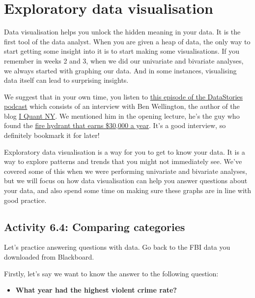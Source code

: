 \documentclass[
]{book}
\providecommand{\tightlist}{%
  \setlength{\itemsep}{0pt}\setlength{\parskip}{0pt}}
\begin{document}
\hypertarget{exploratory-data-visualisation}{%
\section{Exploratory data visualisation}\label{exploratory-data-visualisation}}

Data visualisation helps you unlock the hidden meaning in your data. It is the first tool of the data analyst. When you are given a heap of data, the only way to start getting some insight into it is to start making some visualisations. If you remember in weeks 2 and 3, when we did our univariate and bivariate analyses, we always started with graphing our data. And in some instances, visualising data itself can lead to surprising insights.

We suggest that in your own time, you listen to \href{http://datastori.es/66-iquantnyc/}{this episode of the DataStories podcast} which consists of an interview with Ben Wellington, the author of the blog \href{http://iquantny.tumblr.com/}{I Quant NY}. We mentioned him in the opening lecture, he's the guy who found the \href{https://www.dailymail.co.uk/news/article-2618927/Blurred-lines-How-New-York-fire-hydrant-sees-33-000-flow-city-coffers-parking-fines.html}{fire hydrant that earns \$30,000 a year}. It's a good interview, so definitely bookmark it for later!

Exploratory data visualisation is a way for you to get to know your data. It is a way to explore patterns and trends that you might not immediately see. We've covered some of this when we were performing univariate and bivariate analyses, but we will focus on how data visualisation can help you answer questions about your data, and also spend some time on making sure these graphs are in line with good practice.

\hypertarget{activity-6.4-comparing-categories}{%
\subsection{Activity 6.4: Comparing categories}\label{activity-6.4-comparing-categories}}

Let's practice answering questions with data. Go back to the FBI data you downloaded from Blackboard.

Firstly, let's say we want to know the answer to the following question:

\begin{itemize}
\tightlist
\item
  \textbf{What year had the highest violent crime rate?}
\end{itemize}
\end{document}
